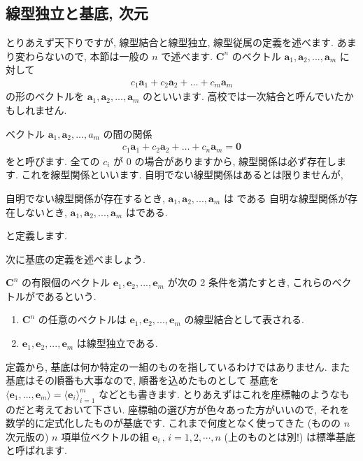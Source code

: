 \documentclass[openany, a4paper, oneside]{jsbook}
\begin{document}
\subsection{線型独立と基底, 次元 \label{sec:basis}}

とりあえず天下りですが, 線型結合と線型独立, 線型従属の定義を述べます.
あまり変わらないので, 本節は一般の $n$ で述べます.
 $\bm{C}^n$ のベクトル $\bm{a}_{1},\bm{a}_{2},...,\bm{a}_{m}$ に対して
\begin{align}
    c_{1}\bm{a}_{1} + c_{2}\bm{a}_{2} + \dots + c_{m}\bm{a}_{m}
\end{align}
の形のベクトルを $\bm{a}_{1},\bm{a}_{2},...,\bm{a}_{m}$ のといいます.
高校では一次結合と呼んでいたかもしれません.

ベクトル $\bm{a}_{1},\bm{a}_{2},...,{a}_{m}$ の間の関係
\begin{align}
    c_{1}\bm{a}_{1} + c_{2}\bm{a}_{2} + \dots + c_{n}\bm{a}_{m} = \bm{0}
\end{align}
をと呼びます. 全ての $c_{i}$ が $0$ の場合がありますから, 線型関係は必ず存在します.
これを線型関係といいます.
自明でない線型関係はあるとは限りませんが,
    \begin{defn}自明でない線型関係が存在するとき,  $\bm{a}_{1},\bm{a}_{2},...,\bm{a}_{m}$ は
である
自明な線型関係が存在しないとき,  $\bm{a}_{1},\bm{a}_{2},...,\bm{a}_{m}$ はである.
    \end{defn}
と定義します.

次に基底の定義を述べましょう.
    \begin{defn} $\bm{C}^n$ の有限個のベクトル $\bm{e}_{1},\bm{e}_{2},...,\bm{e}_{m}$ が次の 2 条件を満たすとき,
これらのベクトルがであるという.
\begin{enumerate}
    \item  $\bm{C}^n$ の任意のベクトルは $\bm{e}_{1},\bm{e}_{2},...,\bm{e}_{m}$ の線型結合として表される.
    \item  $\bm{e}_{1},\bm{e}_{2},...,\bm{e}_m$ は線型独立である.
\end{enumerate}
    \end{defn}
定義から, 基底は何か特定の一組のものを指しているわけではありません.
また基底はその順番も大事なので, 順番を込めたものとして
基底を $\langle \bm{e}_1,\dots,\bm{e}_{m} \rangle = \langle \bm{e}_{i} \rangle _{i=1}^m$ などとも書きます.
とりあえずはこれを座標軸のようなものだと考えておいて下さい.
座標軸の選び方が色々あった方がいいので, それを数学的に定式化したものが基底です.
これまで何度となく使ってきた (ものの $n$ 次元版の) $n$ 項単位ベクトルの組
 $\bm{e}_{i} \, , \, i=1,2,\dotsb,n$ (上のものとは別!) は標準基底と呼ばれます.
\end{document}
